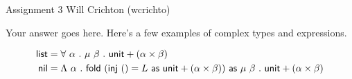 \documentclass[11pt]{article}
\begin{document}
\hwtitle
  {Assignment 3}
  {Will Crichton (wcrichto)} %


Your answer goes here. Here's a few examples of complex types and expressions.

\begin{align*}
\mathsf{list} &= \forall~{\alpha}~.~{\mu~{\beta}~.~{{\mathsf{unit}} + {({\alpha} \times {\beta})}}} \\
\mathsf{nil} &= \Lambda~{\alpha}~.~{\mathsf{fold}~{(\mathsf{inj} ~ {()} = {L} ~ \mathsf{as} ~ {{\mathsf{unit}} + {({\alpha} \times {\beta})}})}~\mathsf{as}~{\mu~{\beta}~.~{{\mathsf{unit}} + {({\alpha} \times {\beta})}}}} \\
\end{align*}
\end{document}
